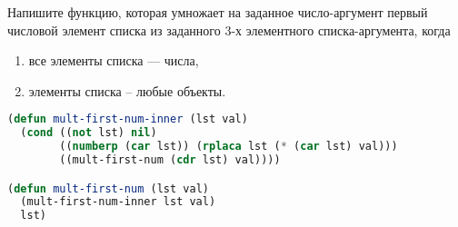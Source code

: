 Напишите функцию, которая умножает на заданное число-аргумент
первый числовой элемент списка из заданного 3-х элементного списка-аргумента,
когда

\begin{enumerate}
    \item все элементы списка --- числа,
    \item элементы списка -- любые объекты.
\end{enumerate}

\begin{lstlisting}[language=Lisp]
(defun mult-first-num-inner (lst val)
  (cond ((not lst) nil)
        ((numberp (car lst)) (rplaca lst (* (car lst) val)))
        ((mult-first-num (cdr lst) val))))

(defun mult-first-num (lst val)
  (mult-first-num-inner lst val)
  lst)
\end{lstlisting}

